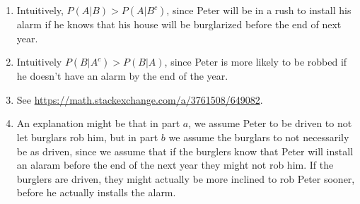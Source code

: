 \begin{enumerate}[label=(\alph*)]

\item Intuitively, $P(A|B) > P(A|B^{c})$, since Peter will be in a rush to install his alarm if he knows that his house will be burglarized before the end of next year.

\item Intuitively $P(B|A^{c}) > P(B|A)$, since Peter is more likely to be robbed if he doesn't have an alarm by the end of the year.

\item  See \url{https://math.stackexchange.com/a/3761508/649082}.

\item An explanation might be that in part $a$, we assume Peter to be driven to not let burglars rob him, but in part $b$ we assume the burglars to not necessarily be as driven, since we assume that if the burglers know that Peter will install an alaram before the end of the next year they might not rob him. If the burglers are driven, they might actually be more inclined to rob Peter sooner, before he actually installs the alarm.
\end{enumerate}